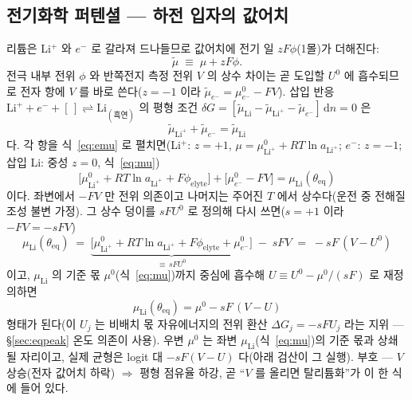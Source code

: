 \documentclass[11pt,a4paper]{article}
\newcommand{\dd}{\mathrm{d}}
\newcommand{\eq}{\mathrm{eq}}
\begin{document}
\subsection{전기화학 퍼텐셜 — 하전 입자의 값어치}
리튬은 Li$^+$ 와 $e^-$ 로 갈라져 드나들므로 값어치에 전기 일 $zF\phi$(1몰)가 더해진다:
\begin{equation}
\tilde\mu\;\equiv\;\mu+zF\phi.
\label{eq:emu}
\end{equation}
전극 내부 전위 $\phi$ 와 반쪽전지 측정 전위 $V$ 의 상수 차이는 곧 도입할 $U^0$ 에 흡수되므로 전자 항에 $V$ 를 바로 쓴다($z=-1$ 이라 $\tilde\mu_{e^-}=\mu_{e^-}^0-FV$). 삽입 반응 $\mathrm{Li}^++e^-+[\,]\rightleftharpoons\mathrm{Li}_{(\text{흑연})}$ 의 평형 조건 $\delta G=[\tilde\mu_{\mathrm{Li}}-\tilde\mu_{\mathrm{Li}^+}-\tilde\mu_{e^-}]\,\dd n=0$ 은
\begin{equation}
\tilde\mu_{\mathrm{Li}^+}+\tilde\mu_{e^-}=\tilde\mu_{\mathrm{Li}}
\label{eq:eqbalance}
\end{equation}
다. 각 항을 식~\eqref{eq:emu} 로 펼치면(Li$^+$: $z{=}{+}1$, $\mu=\mu^0_{\mathrm{Li}^+}{+}RT\ln a_{\mathrm{Li}^+}$; $e^-$: $z{=}{-}1$; 삽입 Li: 중성 $z{=}0$, 식~\eqref{eq:mu})
\begin{equation}
\big[\mu^0_{\mathrm{Li}^+}+RT\ln a_{\mathrm{Li}^+}+F\phi_{\mathrm{elyte}}\big]
+\big[\mu^0_{e^-}-FV\big]
=\mu_{\mathrm{Li}}(\theta_{\eq})
\label{eq:eqexpand}
\end{equation}
이다. 좌변에서 $-FV$ 만 전위 의존이고 나머지는 주어진 $T$ 에서 상수다(운전 중 전해질 조성 불변 가정). 그 상수 덩이를 $sFU^0$ 로 정의해 다시 쓰면($s=+1$ 이라 $-FV=-sFV$)
\begin{equation}
\mu_{\mathrm{Li}}(\theta_{\eq})
\;=\;\underbrace{\big[\mu^0_{\mathrm{Li}^+}+RT\ln a_{\mathrm{Li}^+}
+F\phi_{\mathrm{elyte}}+\mu^0_{e^-}\big]}_{\equiv\,sFU^0}\;-\;sFV
\;=\;-sF\,(V-U^0)
\label{eq:constbundle}
\end{equation}
이고, $\mu_{\mathrm{Li}}$ 의 기준 몫 $\mu^0$(식~\eqref{eq:mu})까지 중심에 흡수해 $U\equiv U^0-\mu^0/(sF)$ 로 재정의하면
\begin{equation}
\mu_{\mathrm{Li}}(\theta_{\eq})=\mu^0-sF\,(V-U)
\label{eq:eqcond}
\end{equation}
형태가 된다(이 $U_j$ 는 비배치 몫 자유에너지의 전위 환산 $\Delta G_j=-sFU_j$ 라는 지위 — \S\ref{sec:eqpeak} 온도 의존이 사용). 우변 $\mu^0$ 는 좌변 $\mu_{\mathrm{Li}}$(식~\eqref{eq:mu})의 기준 몫과 상쇄될 자리이고, 실제 균형은 logit 대 $-sF(V-U)$ 다(아래 검산이 그 실행). 부호 — $V$ 상승(전자 값어치 하락) $\Rightarrow$ 평형 점유율 하강, 곧 ``$V$ 를 올리면 탈리튬화''가 이 한 식에 들어 있다.
\end{document}
